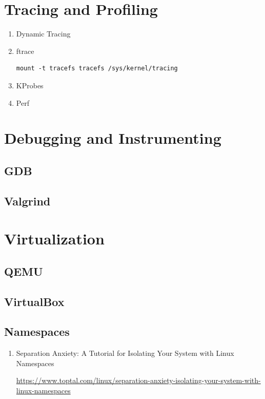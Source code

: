 \documentclass[12pt,a4paper]{article}
\begin{document}
\section{Tracing and Profiling}

\begin{enumerate}
\item Dynamic Tracing
\item ftrace
\begin{verbatim}
mount -t tracefs tracefs /sys/kernel/tracing
\end{verbatim}
\item KProbes
\item Perf
\end{enumerate}

\section{Debugging and Instrumenting}

\subsection{GDB}

\subsection{Valgrind}

\section{Virtualization}

\subsection{QEMU}

\subsection{VirtualBox}

\subsection{Namespaces}

\begin{enumerate}
\item Separation Anxiety: A Tutorial for Isolating Your
      System with Linux Namespaces

    \url{https://www.toptal.com/linux/separation-anxiety-isolating-your-system-with-linux-namespaces}

\end{enumerate}
\end{document}
